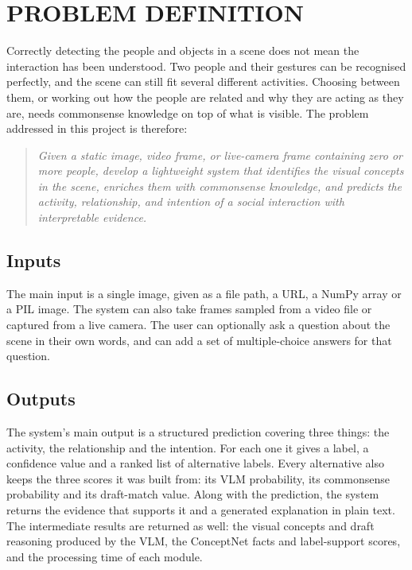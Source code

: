 \section{PROBLEM DEFINITION}

Correctly detecting the people and objects in a scene does not mean the interaction has been understood. Two people and their gestures can be recognised perfectly, and the scene can still fit several different activities. Choosing between them, or working out how the people are related and why they are acting as they are, needs commonsense knowledge on top of what is visible. The problem addressed in this project is therefore:

\begin{quote}
\itshape Given a static image, video frame, or live-camera frame containing zero or more people, develop a lightweight system that identifies the visual concepts in the scene, enriches them with commonsense knowledge, and predicts the activity, relationship, and intention of a social interaction with interpretable evidence.
\end{quote}

\subsection{Inputs}
The main input is a single image, given as a file path, a URL, a NumPy array or a PIL image. The system can also take frames sampled from a video file or captured from a live camera. The user can optionally ask a question about the scene in their own words, and can add a set of multiple-choice answers for that question.

\subsection{Outputs}
The system's main output is a structured prediction covering three things: the activity, the relationship and the intention. For each one it gives a label, a confidence value and a ranked list of alternative labels. Every alternative also keeps the three scores it was built from: its VLM probability, its commonsense probability and its draft-match value. Along with the prediction, the system returns the evidence that supports it and a generated explanation in plain text. The intermediate results are returned as well: the visual concepts and draft reasoning produced by the VLM, the ConceptNet facts and label-support scores, and the processing time of each module.

